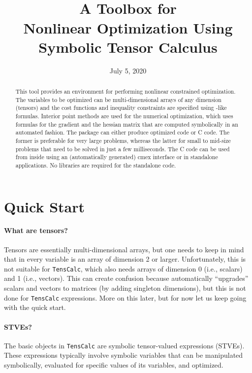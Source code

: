 \documentclass[11pt]{article}
\title{\sc \TC \\[1em]\Large A \matlab{} Toolbox for \\
  Nonlinear Optimization Using Symbolic Tensor Calculus}
\author{\jph}
\date{July 5, 2020}
\newcommand{\TC}{\texttt{TensCalc}}
\theoremstyle{remark}
\begin{document}
                        \maketitle

\begin{abstract}
  This tool provides an environment for performing nonlinear
  constrained optimization. The variables to be optimized can be
  multi-dimensional arrays of any dimension (tensors) and the cost
  functions and inequality constraints are specified using
  \matlab-like formulas. Interior point methods are used for the
  numerical optimization, which uses formulas for the gradient and the
  hessian matrix that are computed symbolically in an automated
  fashion.  The package can either produce optimized \matlab{} code or
  C code. The former is preferable for very large problems, whereas
  the latter for small to mid-size problems that need to be solved in
  just a few milliseconds. The C code can be used from inside
  \matlab{} using an (automatically generated) cmex interface or in
  standalone applications. No libraries are required for the
  standalone code.
\end{abstract}

\newpage

\tableofcontents

\newpage

\section{Quick Start}

\paragraph{What are tensors?} Tensors are essentially multi-dimensional arrays,
but one needs to keep in mind that in \matlab{} every variable is an
array of dimension 2 or larger. Unfortunately, this is not suitable
for \TC{}, which also needs arrays of dimension 0 (i.e., scalars) and
1 (i.e., vectors). This can create confusion because \matlab{}
automatically ``upgrades'' scalars and vectors to matrices (by adding
singleton dimensions), but this is not done for \TC{}
expressions. More on this later, but for now let us keep going with
the quick start.

\paragraph{STVEs?} The basic objects in \TC{} are symbolic
tensor-valued expressions (STVEs). These expressions typically involve
symbolic variables that can be manipulated symbolically, evaluated for
specific values of its variables, and optimized.
\end{document}
